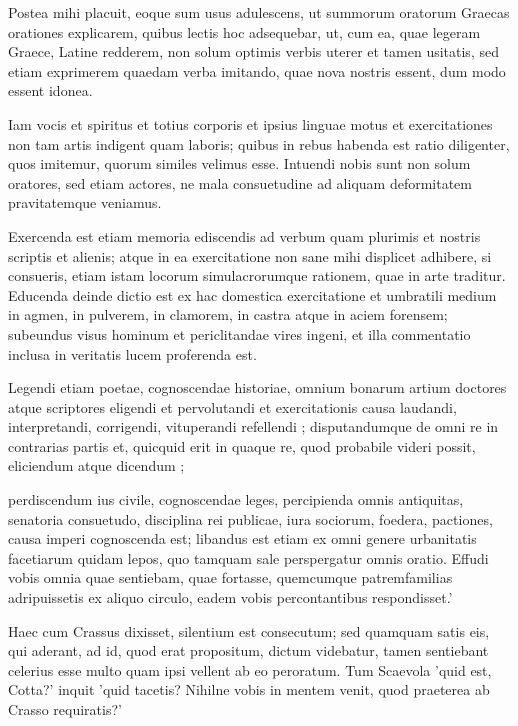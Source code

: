  Postea mihi placuit, eoque sum usus adulescens, ut summorum oratorum Graecas orationes explicarem, quibus lectis hoc adsequebar, ut, cum ea, quae legeram Graece, Latine redderem, non solum optimis verbis uterer et tamen usitatis, sed etiam exprimerem quaedam verba imitando, quae nova nostris essent, dum modo essent idonea.

 Iam vocis et spiritus et totius corporis et ipsius linguae motus et exercitationes non tam artis indigent quam laboris; quibus in rebus habenda est ratio diligenter, quos imitemur, quorum similes velimus esse. Intuendi nobis sunt non solum oratores, sed etiam actores, ne mala consuetudine ad aliquam deformitatem pravitatemque veniamus.

 Exercenda est etiam memoria ediscendis ad verbum quam plurimis et nostris scriptis et alienis; atque in ea exercitatione non sane mihi displicet adhibere, si consueris, etiam istam locorum simulacrorumque rationem, quae in arte traditur. Educenda deinde dictio est ex hac domestica exercitatione et umbratili medium in agmen, in pulverem, in clamorem, in castra atque in aciem forensem; subeundus visus hominum et periclitandae vires ingeni, et illa commentatio inclusa in veritatis lucem proferenda est.

 Legendi etiam poetae, cognoscendae historiae, omnium bonarum artium doctores atque scriptores eligendi et pervolutandi et exercitationis causa laudandi, interpretandi, corrigendi, vituperandi refellendi ; disputandumque de omni re in contrarias partis et, quicquid erit in quaque re, quod probabile videri possit, eliciendum atque dicendum ;

 perdiscendum ius civile, cognoscendae leges, percipienda omnis antiquitas, senatoria consuetudo, disciplina rei publicae, iura sociorum, foedera, pactiones, causa imperi cognoscenda est; libandus est etiam ex omni genere urbanitatis facetiarum quidam lepos, quo tamquam sale perspergatur omnis oratio. Effudi vobis omnia quae sentiebam, quae fortasse, quemcumque patremfamilias adripuissetis ex aliquo circulo, eadem vobis percontantibus respondisset.'

 Haec cum Crassus dixisset, silentium est consecutum; sed quamquam satis eis, qui aderant, ad id, quod erat propositum, dictum videbatur, tamen sentiebant celerius esse multo quam ipsi vellent ab eo peroratum. Tum Scaevola 'quid est, Cotta?' inquit 'quid tacetis? Nihilne vobis in mentem venit, quod praeterea ab Crasso requiratis?'

